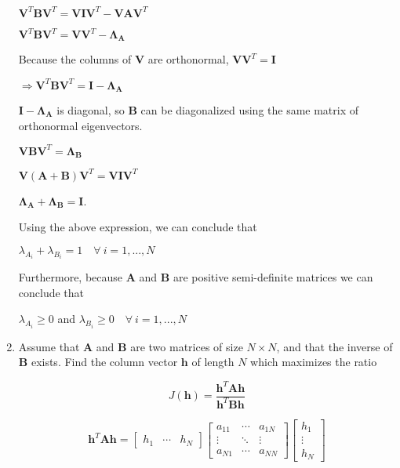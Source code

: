 \documentclass[fleqn]{article}
\begin{document}
\begin{enumerate}
		$\mathbf{V}^T\mathbf{B}\mathbf{V}^T = \mathbf{V}\mathbf{I}\mathbf{V}^T - \mathbf{V}\mathbf{A}\mathbf{V}^T$
		
		$\mathbf{V}^T\mathbf{B}\mathbf{V}^T = \mathbf{V}\mathbf{V}^T - \mathbf{\Lambda_A}$
		
		Because the columns of $\mathbf{V}$ are orthonormal, $\mathbf{V}\mathbf{V}^T = \mathbf{I}$
		
		$\Rightarrow \mathbf{V}^T\mathbf{B}\mathbf{V}^T = \mathbf{I} - \mathbf{\Lambda_A}$
		
		$\mathbf{I} - \mathbf{\Lambda_A}$ is diagonal, so $\mathbf{B}$ can be diagonalized using the same matrix of orthonormal eigenvectors.
		
		$\mathbf{V}\mathbf{B}\mathbf{V}^T = \mathbf{\Lambda_B}$		
		
		$\mathbf{V}(\mathbf{A} + \mathbf{B})\mathbf{V}^T = \mathbf{V}\mathbf{I}\mathbf{V}^T$
		
		$\mathbf{\Lambda_A} + \mathbf{\Lambda_B} = \mathbf{I}$.
		
		Using the above expression, we can conclude that
		
		$\lambda_{A_i} + \lambda_{B_i} = 1\quad \forall\ i = 1,...,N$
		
		Furthermore, because $\mathbf{A}$ and $\mathbf{B}$ are positive semi-definite matrices we can conclude that
		
		$\lambda_{A_i} \geq 0$ and $\lambda_{B_i} \geq 0\quad \forall\ i = 1,...,N$
		
		\item Assume that $\mathbf{A}$ and $\mathbf{B}$ are two matrices of size $N \times N$, and that the inverse of $\mathbf{B}$ exists. Find the column vector $\mathbf{h}$ of length $N$ which maximizes the ratio
		
		\begin{equation*}
			J(\mathbf{h}) = \frac{\mathbf{h}^T\mathbf{A}\mathbf{h}}{\mathbf{h}^T\mathbf{B}\mathbf{h}}
		\end{equation*}
		
		\begin{equation*}
			\mathbf{h}^T\mathbf{A}\mathbf{h} = \begin{bmatrix}h_1 & \cdots & h_N\end{bmatrix}\begin{bmatrix}a_{11} & \cdots & a_{1N} \\ \vdots & \ddots & \vdots \\ a_{N1} & \cdots & a_{NN}\end{bmatrix}\begin{bmatrix}h_1 \\ \vdots \\ h_N \end{bmatrix}
		\end{equation*}
		

\end{enumerate}
\end{document}
